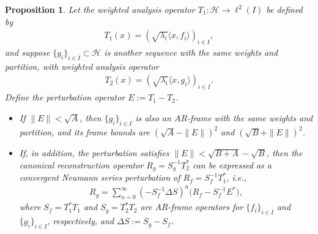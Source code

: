 \documentclass[12pt,titlepage]{amsart}
\newtheorem{prop}[thm]{Proposition}
\theoremstyle{definition}
\theoremstyle{remark}
\begin{document}
\begin{prop} \label{Prop.3}
Let the weighted analysis operator $T_1: \mathcal{H} \to
\ell^2(I)$ be defined by
\begin{eqnarray*}
T_1(x) = (\sqrt{\lambda_i} \langle x, f_i \rangle)_{i \in I},
\end{eqnarray*}
and suppose $\{ g_i \}_{i \in I} \subset \mathcal{H}$ is another
sequence with the same weights and partition, with weighted
analysis operator
\begin{eqnarray*}
T_2(x) = (\sqrt{\lambda_i} \langle x, g_i \rangle)_{i \in I}.
\end{eqnarray*}
Define the perturbation operator $E := T_1 - T_2$.
\begin{itemize}
\item[(i)] If $\|E\| < \sqrt{A}$, then $\{ g_i \}_{i \in I}$ is
also an $AR$-frame with the same weights and partition, and its
frame bounds are $(\sqrt{A} - \|E\|)^2$ and $(\sqrt{B} +
\|E\|)^2$. \item[(ii)] If, in addition, the perturbation satisfies
$\|E\| < \sqrt{B+A}-\sqrt{B}$, then the canonical reconstruction
operator $R_g = S_g^{-1} T_2^*$ can be expressed as a convergent
Neumann series perturbation of $R_f = S_f^{-1} T_1^*$, i.e.,
\begin{eqnarray*}
R_g = \sum_{n=0}^{\infty} (- S_f^{-1} \Delta S)^n \big(R_f -
S_f^{-1} E^* \big),
\end{eqnarray*}
where $S_f = T_1^* T_1$ and $S_g = T_2^* T_2$ are $AR$-frame
operators for $\{ f_i \}_{i \in I}$ and $\{ g_i \}_{i \in I}$,
respectively, and $\Delta S := S_g - S_f$.
\end{itemize}
\end{prop}
\end{document}
